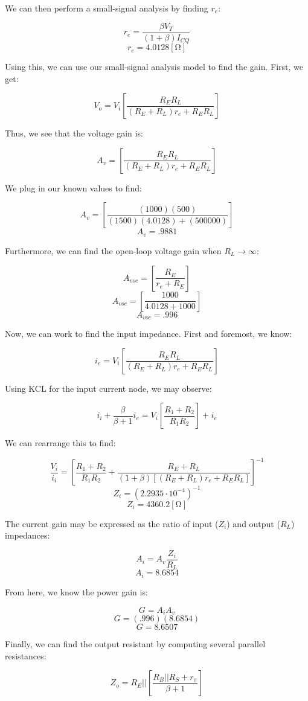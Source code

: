 \begin{enumerate}
    We can then perform a small-signal analysis by finding $r_e$:

    $$r_e=\frac{\beta V_T}{(1+\beta)I_{CQ}}$$
    $$r_e=4.0128[\si{\ohm}]$$

    Using this, we can use our small-signal analysis model to find the gain. First, we get:

    $$V_o=V_i\left[ \frac{R_ER_L}{(R_E+R_L)r_e+R_ER_L} \right]$$

    Thus, we see that the voltage gain is:

    $$A_v=\left[ \frac{R_ER_L}{(R_E+R_L)r_e+R_ER_L} \right]$$

    We plug in our known values to find:

    $$A_v=\left[ \frac{(1000)(500)}{(1500)(4.0128)+(500000)} \right]$$
    $$\boxed{A_v=.9881}$$

    Furthermore, we can find the open-loop voltage gain when $R_L\to\infty$:

    $$A_{voc}=\left[ \frac{R_E}{r_e+R_E} \right]$$
    $$A_{voc}=\left[ \frac{1000}{4.0128+1000} \right]$$
    $$\boxed{A_{voc}=.996}$$

    Now, we can work to find the input impedance. First and foremost, we know:

    $$i_e=V_i\left[ \frac{R_ER_L}{(R_E+R_L)r_e+R_ER_L} \right]$$

    Using KCL for the input current node, we may observe:

    $$i_i+\frac{\beta}{\beta+1}i_e=V_i\left[ \frac{R_1+R_2}{R_1R_2} \right]+i_e$$

    We can rearrange this to find:

    $$\frac{V_i}{i_i}=\left[ \frac{R_1+R_2}{R_1R_2}+\frac{R_E+R_L}{(1+\beta)[(R_E+R_L)r_e+R_ER_L]} \right]^{-1}$$
    $$Z_{i}=\left(2.2935\cdot10^{-4}\right)^{-1}$$
    $$\boxed{Z_{i}=4360.2[\si{\ohm}]}$$

    The current gain may be expressed as the ratio of input ($Z_i$) and output ($R_L$) impedances:

    $$A_i=A_v\frac{Z_i}{R_L}$$
    $$\boxed{A_i=8.6854}$$

    From here, we know the power gain is:

    $$G=A_iA_v$$
    $$G=(.996)(8.6854)$$
    $$\boxed{G=8.6507}$$

    Finally, we can find the output resistant by computing several parallel resistances:

    $$Z_o=R_E||\left[ \frac{R_B||R_S+r_{\pi}}{\beta +1} \right]$$


\end{enumerate}
